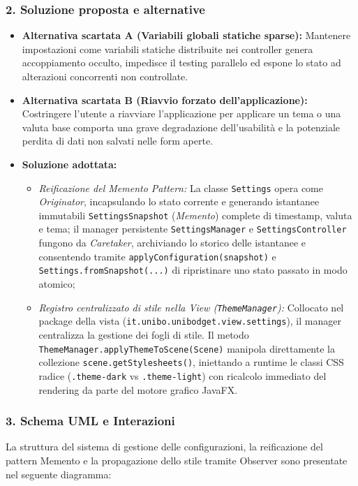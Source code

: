 \documentclass[11pt,a4paper,openright]{report}
\begin{document}
\subsubsection*{2. Soluzione proposta e alternative}
\begin{itemize}
  \item \textbf{Alternativa scartata A (Variabili globali statiche sparse):} Mantenere impostazioni come variabili statiche distribuite nei controller genera accoppiamento occulto, impedisce il testing parallelo ed espone lo stato ad alterazioni concorrenti non controllate.
  \item \textbf{Alternativa scartata B (Riavvio forzato dell'applicazione):} Costringere l'utente a riavviare l'applicazione per applicare un tema o una valuta base comporta una grave degradazione dell'usabilità e la potenziale perdita di dati non salvati nelle form aperte.
  \item \textbf{Soluzione adottata:}
  \begin{itemize}
    \item \emph{Reificazione del Memento Pattern:} La classe \texttt{Settings} opera come \emph{Originator}, incapsulando lo stato corrente e generando istantanee immutabili \texttt{SettingsSnapshot} (\emph{Memento}) complete di timestamp, valuta e tema; il manager persistente \texttt{SettingsManager} e \texttt{SettingsController} fungono da \emph{Caretaker}, archiviando lo storico delle istantanee e consentendo tramite \texttt{applyConfiguration(snapshot)} e \texttt{Settings.fromSnapshot(...)} di ripristinare uno stato passato in modo atomico;
    \item \emph{Registro centralizzato di stile nella View (\texttt{ThemeManager}):} Collocato nel package della vista (\texttt{it.unibo.unibodget.view.settings}), il manager centralizza la gestione dei fogli di stile. Il metodo \texttt{ThemeManager.applyThemeToScene(Scene)} manipola direttamente la collezione \texttt{scene.getStylesheets()}, iniettando a runtime le classi CSS radice (\texttt{.theme-dark} vs \texttt{.theme-light}) con ricalcolo immediato del rendering da parte del motore grafico JavaFX.
  \end{itemize}
\end{itemize}

\subsubsection*{3. Schema UML e Interazioni}
La struttura del sistema di gestione delle configurazioni, la reificazione del pattern Memento e la propagazione dello stile tramite Observer sono presentate nel seguente diagramma:
\end{document}
